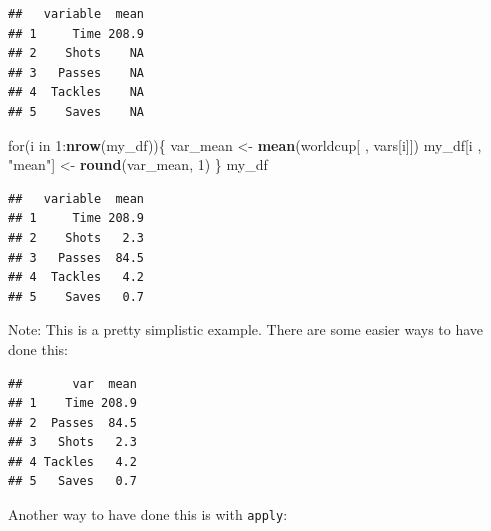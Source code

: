 \documentclass[]{book}
\makeatletter
\newenvironment{Shaded}{\begin{snugshade}}{\end{snugshade}}
\newcommand{\KeywordTok}[1]{\textcolor[rgb]{0.13,0.29,0.53}{\textbf{{#1}}}}
\newcommand{\DataTypeTok}[1]{\textcolor[rgb]{0.13,0.29,0.53}{{#1}}}
\newcommand{\DecValTok}[1]{\textcolor[rgb]{0.00,0.00,0.81}{{#1}}}
\newcommand{\StringTok}[1]{\textcolor[rgb]{0.31,0.60,0.02}{{#1}}}
\newcommand{\NormalTok}[1]{{#1}}
\newenvironment{kframe}{%
\medskip{}
\setlength{\fboxsep}{.8em}
 \def\at@end@of@kframe{}%
 \ifinner\ifhmode%
  \def\at@end@of@kframe{\end{minipage}}%
  \begin{minipage}{\columnwidth}%
 \fi\fi%
 \def\FrameCommand##1{\hskip\@totalleftmargin \hskip-\fboxsep
 \colorbox{shadecolor}{##1}\hskip-\fboxsep
     \hskip-\linewidth \hskip-\@totalleftmargin \hskip\columnwidth}%
 \MakeFramed {\advance\hsize-\width
   \@totalleftmargin\z@ \linewidth\hsize
   \@setminipage}}%
 {\par\unskip\endMakeFramed%
 \at@end@of@kframe}
\renewenvironment{Shaded}{\begin{kframe}}{\end{kframe}}
\makeatother
\begin{document}
\begin{verbatim}
##   variable  mean
## 1     Time 208.9
## 2    Shots    NA
## 3   Passes    NA
## 4  Tackles    NA
## 5    Saves    NA
\end{verbatim}

\begin{Shaded}
\begin{Highlighting}[]
\NormalTok{for(i in }\DecValTok{1}\NormalTok{:}\KeywordTok{nrow}\NormalTok{(my_df))\{}
        \NormalTok{var_mean <-}\StringTok{ }\KeywordTok{mean}\NormalTok{(worldcup[ , vars[i]])}
        \NormalTok{my_df[i , }\StringTok{"mean"}\NormalTok{] <-}\StringTok{ }\KeywordTok{round}\NormalTok{(var_mean, }\DecValTok{1}\NormalTok{)}
\NormalTok{\}}
\NormalTok{my_df}
\end{Highlighting}
\end{Shaded}

\begin{verbatim}
##   variable  mean
## 1     Time 208.9
## 2    Shots   2.3
## 3   Passes  84.5
## 4  Tackles   4.2
## 5    Saves   0.7
\end{verbatim}

Note: This is a pretty simplistic example. There are some easier ways to
have done this:

\begin{Shaded}
\end{Shaded}

\begin{verbatim}
##       var  mean
## 1    Time 208.9
## 2  Passes  84.5
## 3   Shots   2.3
## 4 Tackles   4.2
## 5   Saves   0.7
\end{verbatim}

Another way to have done this is with \texttt{apply}:
\end{document}
